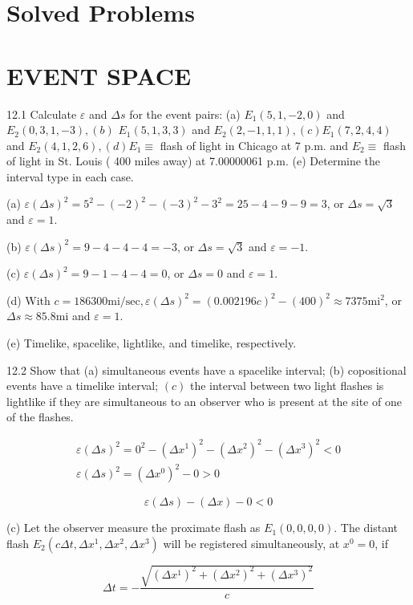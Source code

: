 \documentclass[10pt]{article}
\begin{document}
\section*{Solved Problems}
\section*{EVENT SPACE}
12.1 Calculate $\varepsilon$ and $\Delta s$ for the event pairs: (a) $E_{1}(5,1,-2,0)$ and $E_{2}(0,3,1,-3),(b)$ $E_{1}(5,1,3,3)$ and $E_{2}(2,-1,1,1),(c) E_{1}(7,2,4,4)$ and $E_{2}(4,1,2,6),(d) E_{1} \equiv$ flash of light in Chicago at 7 p.m. and $E_{2} \equiv$ flash of light in St. Louis ( 400 miles away) at 7.00000061 p.m. (e) Determine the interval type in each case.

(a) $\varepsilon(\Delta s)^{2}=5^{2}-(-2)^{2}-(-3)^{2}-3^{2}=25-4-9-9=3$, or $\Delta s=\sqrt{3}$ and $\varepsilon=1$.

(b) $\varepsilon(\Delta s)^{2}=9-4-4-4=-3$, or $\Delta s=\sqrt{3}$ and $\varepsilon=-1$.

(c) $\varepsilon(\Delta s)^{2}=9-1-4-4=0$, or $\Delta s=0$ and $\varepsilon=1$.

(d) With $c=186300 \mathrm{mi} / \mathrm{sec}, \varepsilon(\Delta s)^{2}=(0.002196 c)^{2}-(400)^{2} \approx 7375 \mathrm{mi}^{2}$, or $\Delta s \approx 85.8 \mathrm{mi}$ and $\varepsilon=1$.

(e) Timelike, spacelike, lightlike, and timelike, respectively.

12.2 Show that (a) simultaneous events have a spacelike interval; (b) copositional events have a timelike interval; $(c)$ the interval between two light flashes is lightlike if they are simultaneous to an observer who is present at the site of one of the flashes.


\begin{gather*}
\varepsilon(\Delta s)^{2}=0^{2}-\left(\Delta x^{1}\right)^{2}-\left(\Delta x^{2}\right)^{2}-\left(\Delta x^{3}\right)^{2}<0  \tag{a}\\
\varepsilon(\Delta s)^{2}=\left(\Delta x^{0}\right)^{2}-0>0 \tag{b}
\end{gather*}


$$
\varepsilon(\Delta s)-(\Delta x)-0<0
$$

(c) Let the observer measure the proximate flash as $E_{1}(0,0,0,0)$. The distant flash $E_{2}\left(c \Delta t, \Delta x^{1}, \Delta x^{2}, \Delta x^{3}\right)$ will be registered simultaneously, at $x^{0}=0$, if

$$
\Delta t=-\frac{\sqrt{\left(\Delta x^{1}\right)^{2}+\left(\Delta x^{2}\right)^{2}+\left(\Delta x^{3}\right)^{2}}}{c}
$$
\end{document}
